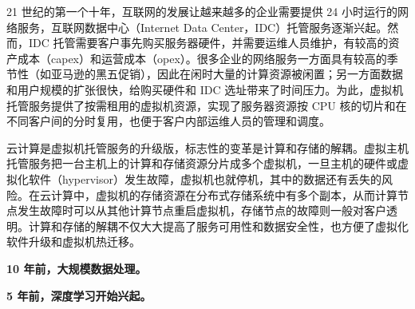 21 世纪的第一个十年，互联网的发展让越来越多的企业需要提供 24 小时运行的网络服务，互联网数据中心（Internet Data Center，IDC）托管服务逐渐兴起。然而，IDC 托管需要客户事先购买服务器硬件，并需要运维人员维护，有较高的资产成本（capex）和运营成本（opex）。很多企业的网络服务一方面具有较高的季节性（如亚马逊的黑五促销），因此在闲时大量的计算资源被闲置；另一方面数据和用户规模的扩张很快，给购买硬件和 IDC 选址带来了时间压力。为此，虚拟机托管服务提供了按需租用的虚拟机资源，实现了服务器资源按 CPU 核的切片和在不同客户间的分时复用，也便于客户内部运维人员的管理和调度。

云计算是虚拟机托管服务的升级版，标志性的变革是计算和存储的解耦。虚拟主机托管服务把一台主机上的计算和存储资源分片成多个虚拟机，一旦主机的硬件或虚拟化软件（hypervisor）发生故障，虚拟机也就停机，其中的数据还有丢失的风险。在云计算中，虚拟机的存储资源在分布式存储系统中有多个副本，从而计算节点发生故障时可以从其他计算节点重启虚拟机，存储节点的故障则一般对客户透明。计算和存储的解耦不仅大大提高了服务可用性和数据安全性，也方便了虚拟化软件升级和虚拟机热迁移。



\textbf{10 年前，大规模数据处理。}

\textbf{5 年前，深度学习开始兴起。}

